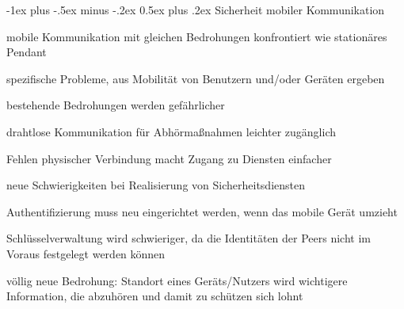\documentclass[a4paper]{article}
\makeatletter
\renewcommand{\section}{\@startsection{section}{1}{0mm}%
 {-1ex plus -.5ex minus -.2ex}%
 {0.5ex plus .2ex}%
 {\normalfont\large\bfseries}}
\makeatother
\begin{document}
\begin{multicols}{3}
      \section{Sicherheit mobiler Kommunikation}
      \begin{itemize*}
            \item mobile Kommunikation mit gleichen Bedrohungen konfrontiert wie stationäres Pendant
            \item spezifische Probleme, aus Mobilität von Benutzern und/oder Geräten ergeben
            \item bestehende Bedrohungen werden gefährlicher
            \begin{itemize*}
                  \item drahtlose Kommunikation für Abhörmaßnahmen leichter zugänglich
                  \item Fehlen physischer Verbindung macht Zugang zu Diensten einfacher
            \end{itemize*}
            \item neue Schwierigkeiten bei Realisierung von Sicherheitsdiensten
            \begin{itemize*}
                  \item Authentifizierung muss neu eingerichtet werden, wenn das mobile Gerät umzieht
                  \item Schlüsselverwaltung wird schwieriger, da die Identitäten der Peers nicht im Voraus festgelegt werden können
            \end{itemize*}
            \item völlig neue Bedrohung: Standort eines Geräts/Nutzers wird wichtigere Information, die abzuhören und damit zu schützen sich lohnt
      \end{itemize*}


\end{multicols}
\end{document}
